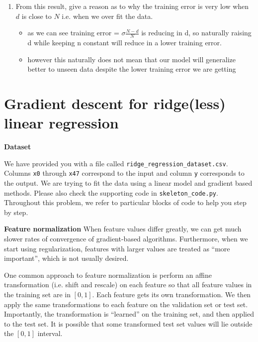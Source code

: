 \documentclass{article}
\newcommand{\nyuparagrah}[1]{\textcolor{nyupurple}{\large #1}}
\begin{document}
\begin{enumerate}
  \item From this result, give a reason as to why the training error is very low when $d$ is close to $N$ i.e. when we over fit  the data. 
\begin{itemize}
    \item as we can see training error = $\sigma\frac{N-d}{N}$ is reducing in d, so naturally raising d while keeping n constant will reduce in a lower training error. 
    \item however this naturally does not mean that our model will generalize better to unseen data despite the lower training error we are getting 
\end{itemize}

   
\setcounter{saveenum}{\value{enumi}}
\end{enumerate}

\section{\large Gradient descent for ridge(less) linear regression}

\nyuparagrah{\bf Dataset} 

We have provided you with a file called \texttt{ridge\_regression\_dataset.csv}. Columns \texttt{x0} through \texttt{x47} correspond to the input and column \texttt{y} corresponds to the output. We are trying to fit the data using a linear model and gradient based methods. Please also check the supporting code in \texttt{skeleton\_code.py}. Throughout this problem, we refer to particular blocks of code to help you step by step. 


\nyuparagrah{\bf Feature normalization}
When feature values differ greatly, we can get much slower rates of
convergence of gradient-based algorithms. Furthermore, when we start
using regularization, features with
larger values are treated as ``more important'', which is not usually
desired.  

One common approach to feature normalization is perform
an affine transformation (i.e. shift and rescale) on each feature
so that all feature values in the training set are in $[0,1]$. Each
feature gets its own transformation. We then apply the same transformations
to each feature on the validation set or test set. Importantly, the transformation is ``learned'' on the
training set, and then applied to the test set. It is possible that
some transformed test set values will lie outside the $[0,1]$ interval.
\end{document}
